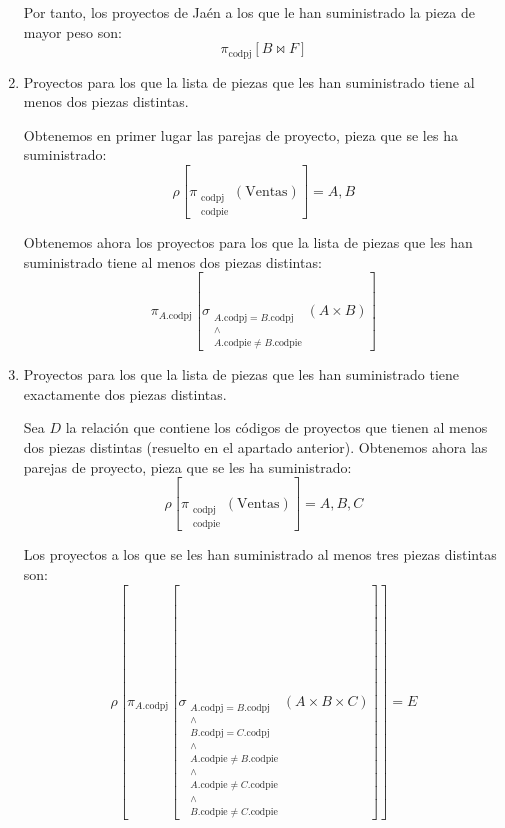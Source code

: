 \begin{ejercicio}
\begin{enumerate}
        Por tanto, los proyectos de Jaén a los que le han suministrado la pieza de mayor peso son:
        \begin{equation*}
            \pi_{\text{codpj}}\left[B\bowtie F\right]
        \end{equation*}

        \item Proyectos para los que la lista de piezas que les han suministrado tiene al menos dos piezas distintas.
        
        Obtenemos en primer lugar las parejas de proyecto, pieza que se les ha suministrado:
        \begin{equation*}
            \rho\left[\pi_{\substack{\text{codpj}\\\text{codpie}}}\left(\text{Ventas}\right)\right]=A,B
        \end{equation*}

        Obtenemos ahora los proyectos para los que la lista de piezas que les han suministrado tiene al menos dos piezas distintas:
        \begin{equation*}
            \pi_{A.\text{codpj}}\left[\sigma_{\substack{A.\text{codpj}= B.\text{codpj}\\\land \\A.\text{codpie}\neq B.\text{codpie}}}(A\times B)\right]
        \end{equation*}
        
        \item Proyectos para los que la lista de piezas que les han suministrado tiene exactamente dos piezas distintas.
        
        Sea $D$ la relación que contiene los códigos de proyectos que tienen al menos dos piezas distintas (resuelto en el apartado anterior).
        Obtenemos ahora las parejas de proyecto, pieza que se les ha suministrado:
        \begin{equation*}
            \rho\left[\pi_{\substack{\text{codpj}\\\text{codpie}}}\left(\text{Ventas}\right)\right]=A,B,C
        \end{equation*}

        Los proyectos a los que se les han suministrado al menos tres piezas distintas son:
        \begin{equation*}
            \rho\left[\pi_{A.\text{codpj}}\left[\sigma_{\substack{A.\text{codpj}= B.\text{codpj}\\\land \\ B.\text{codpj}= C.\text{codpj}\\ \land \\ A.\text{codpie}\neq B.\text{codpie}\\ \land \\ A.\text{codpie}\neq C.\text{codpie}\\ \land \\ B.\text{codpie}\neq C.\text{codpie}}}(A\times B\times C)\right]\right]=E
        \end{equation*}


\end{enumerate}
\end{ejercicio}
